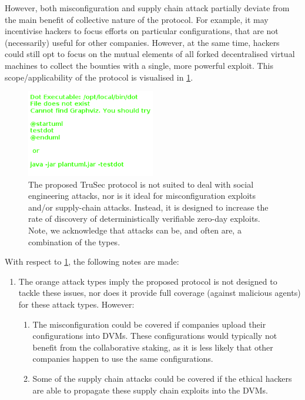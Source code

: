 However, both misconfiguration and supply chain attack partially deviate from the main benefit of collective nature of the protocol. For example, it may incentivise hackers to focus efforts on particular configurations, that are not (necessarily) useful for other companies. However, at the same time, hackers could still opt to focus on the mutual elements of all forked decentralised virtual machines to collect the bounties with a single, more powerful exploit. This scope/applicability of the protocol is visualised in \cref{fig:protocol_scope}.
\begin{figure}[H]
    \centering
    \includegraphics[width=0.50\textwidth]{latex/Images/Diagrams/scope.png}
    \caption{The proposed TruSec protocol is not suited to deal with social engineering attacks, nor is it ideal for misconfiguration exploits and/or supply-chain attacks. Instead, it is designed to increase the rate of discovery of deterministically verifiable zero-day exploits. Note, we acknowledge that attacks can be, and often are, a combination of the types.}
    \label{fig:protocol_scope}
\end{figure}
With respect to \cref{fig:protocol_scope}, the following notes are made:
\begin{enumerate} 
    \item The orange attack types imply the proposed protocol is not designed to tackle these issues, nor does it provide full coverage (against malicious agents) for these attack types. However:
    \begin{enumerate}
        \item The misconfiguration could be covered if companies upload their configurations into DVMs. These configurations would typically not benefit from the collaborative staking, as it is less likely that other companies happen to use the same configurations.
        \item Some of the supply chain attacks could be covered if the ethical hackers are able to propagate these supply chain exploits into the DVMs.
    \end{enumerate}
\end{enumerate}

